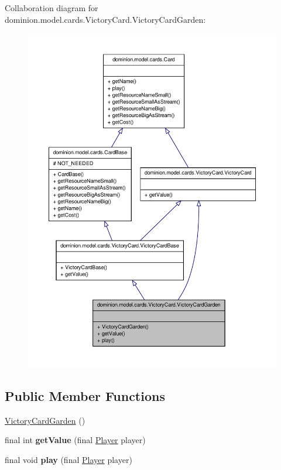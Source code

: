 \-Collaboration diagram for dominion.\-model.\-cards.\-Victory\-Card.\-Victory\-Card\-Garden\-:
\nopagebreak
\begin{figure}[H]
\begin{center}
\leavevmode
\includegraphics[width=350pt]{classdominion_1_1model_1_1cards_1_1VictoryCard_1_1VictoryCardGarden__coll__graph}
\end{center}
\end{figure}
\subsection*{\-Public \-Member \-Functions}
\begin{DoxyCompactItemize}
\item 
\hyperlink{classdominion_1_1model_1_1cards_1_1VictoryCard_1_1VictoryCardGarden_a5678b9b9de994f13d469bd97f11bd8d8}{\-Victory\-Card\-Garden} ()
\item 
\hypertarget{classdominion_1_1model_1_1cards_1_1VictoryCard_1_1VictoryCardGarden_af13b9fb14da7398ff9f09eec2de014f2}{final int {\bfseries get\-Value} (final \hyperlink{interfacedominion_1_1model_1_1Player}{\-Player} player)}\label{classdominion_1_1model_1_1cards_1_1VictoryCard_1_1VictoryCardGarden_af13b9fb14da7398ff9f09eec2de014f2}

\item 
\hypertarget{classdominion_1_1model_1_1cards_1_1VictoryCard_1_1VictoryCardGarden_a7032c4c695898af570195ead113a98d2}{final void {\bfseries play} (final \hyperlink{interfacedominion_1_1model_1_1Player}{\-Player} player)}\label{classdominion_1_1model_1_1cards_1_1VictoryCard_1_1VictoryCardGarden_a7032c4c695898af570195ead113a98d2}

\end{DoxyCompactItemize}


